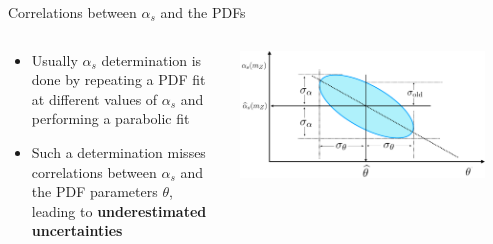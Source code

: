 \documentclass[8pt,t]{beamer}
\begin{document}
\begin{frame}{Correlations between $\alpha_s$ and the PDFs}
  \begin{columns}[T]
    \begin{column}{0.49\textwidth}
      \begin{itemize}
        \item Usually $\alpha_s$ determination is done by repeating a PDF fit at different values of $\alpha_s$ and performing a parabolic fit
        \item Such a determination misses correlations between $\alpha_s$ and the PDF parameters $\theta$, leading to \textbf{underestimated uncertainties}
      \end{itemize}
    \end{column}
    \begin{column}{0.49\textwidth}
      \includegraphics[width=0.9\textwidth]{ellipse.pdf}
    \end{column}
  \end{columns}
\end{frame}
\end{document}
